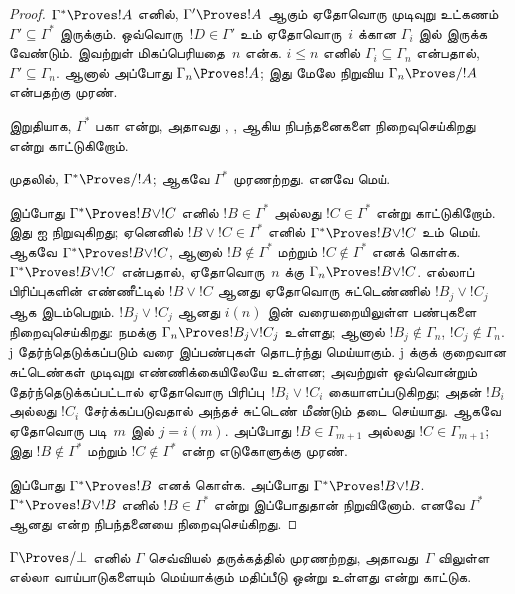 \documentclass[../../../include/open-logic-section]{subfiles}
\begin{document}
\begin{proof}
  $\Gamma^* \Proves !A$ எனில், $\Gamma' \Proves !A$ ஆகும் ஏதோவொரு
  முடிவுறு உட்கணம் $\Gamma' \subseteq \Gamma^*$ இருக்கும்.
  ஒவ்வொரு~$!D \in \Gamma'$ உம் ஏதோவொரு~$i$ க்கான $\Gamma_i$ இல்
  இருக்க வேண்டும். இவற்றுள் மிகப்பெரியதை~$n$ என்க. $i \le n$ எனில்
  $\Gamma_i \subseteq \Gamma_n$ என்பதால், $\Gamma' \subseteq \Gamma_n$.
  ஆனால் அப்போது $\Gamma_n \Proves !A$; இது மேலே நிறுவிய
  $\Gamma_n \Proves/ !A$ என்பதற்கு முரண்.

  இறுதியாக, $\Gamma^*$ பகா என்று, அதாவது ,
  ,  ஆகிய
   நிபந்தனைகளை நிறைவுசெய்கிறது என்று காட்டுகிறோம்.

  முதலில், $\Gamma^* \Proves/ !A$; ஆகவே $\Gamma^*$ முரணற்றது. எனவே
   மெய்.

  இப்போது $\Gamma^* \Proves !B \lor !C$ எனில் $!B \in \Gamma^*$ அல்லது
  $!C \in \Gamma^*$ என்று காட்டுகிறோம். இது  ஐ
  நிறுவுகிறது; ஏனெனில் $!B \lor !C \in \Gamma^*$ எனில்
  $\Gamma^* \Proves !B \lor !C$ உம் மெய். ஆகவே
  $\Gamma^* \Proves !B \lor !C$, ஆனால் $!B \notin \Gamma^*$ மற்றும்
  $!C \notin \Gamma^*$ எனக் கொள்க. $\Gamma^* \Proves !B \lor !C$
  என்பதால், ஏதோவொரு~$n$ க்கு $\Gamma_n \Proves !B \lor !C$.
  எல்லாப் பிரிப்புகளின் எண்ணீட்டில் $!B \lor !C$ ஆனது ஏதோவொரு
  சுட்டெண்ணில் $!B_j \lor !C_j$ ஆக இடம்பெறும். $!B_j \lor !C_j$ ஆனது
  $i(n)$ இன் வரையறையிலுள்ள பண்புகளை நிறைவுசெய்கிறது: நமக்கு
  $\Gamma_n \Proves !B_j \lor !C_j$ உள்ளது; ஆனால்
  $!B_j \notin \Gamma_n$, $!C_j \notin \Gamma_n$. j தேர்ந்தெடுக்கப்படும்
  வரை இப்பண்புகள் தொடர்ந்து மெய்யாகும். j க்குக் குறைவான சுட்டெண்கள்
  முடிவுறு எண்ணிக்கையிலேயே உள்ளன; அவற்றுள் ஒவ்வொன்றும் தேர்ந்தெடுக்கப்பட்டால்
  ஏதோவொரு பிரிப்பு~$!B_i \lor !C_i$ கையாளப்படுகிறது; அதன்
  $!B_i$ அல்லது $!C_i$ சேர்க்கப்படுவதால் அந்தச் சுட்டெண் மீண்டும் தடை
  செய்யாது. ஆகவே
  ஏதோவொரு படி~$m$ இல் $j = i(m)$. அப்போது $!B \in \Gamma_{m+1}$ அல்லது
  $!C \in \Gamma_{m+1}$; இது $!B \notin \Gamma^*$ மற்றும்
  $!C \notin \Gamma^*$ என்ற எடுகோளுக்கு முரண்.

  இப்போது $\Gamma^* \Proves !B$ எனக் கொள்க. அப்போது
  $\Gamma^* \Proves !B \lor !B$. $\Gamma^* \Proves !B \lor !B$ எனில்
  $!B \in \Gamma^*$ என்று இப்போதுதான் நிறுவினோம். எனவே $\Gamma^*$ ஆனது
   என்ற  நிபந்தனையை
  நிறைவுசெய்கிறது.
\end{proof}

\begin{prob}
$\Gamma \Proves/ \bot$ எனில் $\Gamma$ செவ்வியல் தருக்கத்தில் முரணற்றது,
அதாவது~$\Gamma$ விலுள்ள எல்லா வாய்பாடுகளையும் மெய்யாக்கும் மதிப்பீடு ஒன்று
உள்ளது என்று காட்டுக.
\end{prob}
\end{document}
